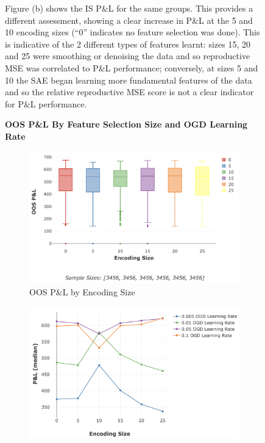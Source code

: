 \documentclass[a4paper,11pt,oneside]{article}
\theoremstyle{plain}
\theoremstyle{definition}
\begin{document}
\begin{figure}[H]
{		\newline Figure (b) shows the IS P\&L for the same groups. This provides a different assessment, showing a clear increase in P\&L at the 5 and 10 encoding sizes (``0'' indicates no feature selection was done). This is indicative of the 2 different types of features learnt: sizes 15, 20 and 25 were smoothing or denoising the data and so reproductive MSE was correlated to P\&L performance; conversely, at sizes 5 and 10 the SAE began learning more fundamental features of the data and so the relative reproductive MSE score is not a clear indicator for P\&L performance.}
	\end{figure}
	
	\begin{figure}[H]
		\centering 
		\textbf{OOS P\&L By Feature Selection Size and OGD Learning Rate}
		\begin{subfigure}{1.0\linewidth}
			\includegraphics[scale=0.45]{images/results/8_2_determinants/OOS_Encoding_PL_Box.png} 
			\caption[OOS P\&L by Encoding Size]{OOS P\&L by Encoding Size}
			\label{figure_OOS_Encoding_PL_Box}
		\end{subfigure}	
		\begin{subfigure}{1.0\linewidth}
			\includegraphics[scale=0.45]{images/results/8_2_determinants/encoding_pl_median.png} 

\end{subfigure}
\end{figure}
\end{document}
